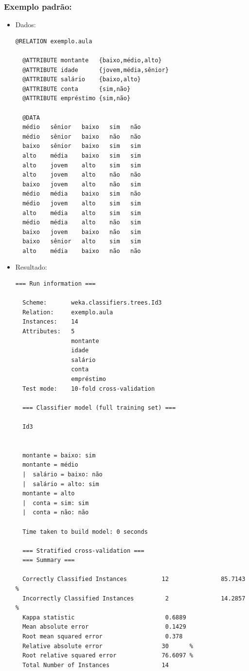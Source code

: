 \documentclass[
    article,            %
    11pt,               %
    oneside,            %
    a4paper,            %
    english,            %
    brazil,             %
    sumario=tradicional,
    ]{abntex2}
\begin{document}
\subsubsection{\textbf{Exemplo padrão:}}

\begin{itemize}
  \item Dados:
  \begin{Verbatim}[frame=single, fontsize=\tiny]
  @RELATION exemplo.aula

  @ATTRIBUTE montante   {baixo,médio,alto}
  @ATTRIBUTE idade      {jovem,média,sênior}
  @ATTRIBUTE salário    {baixo,alto}
  @ATTRIBUTE conta      {sim,não}
  @ATTRIBUTE empréstimo {sim,não}

  @DATA
  médio   sênior   baixo   sim   não 
  médio   sênior   baixo   não   não 
  baixo   sênior   baixo   sim   sim 
  alto    média    baixo   sim   sim 
  alto    jovem    alto    sim   sim 
  alto    jovem    alto    não   não 
  baixo   jovem    alto    não   sim 
  médio   média    baixo   sim   não 
  médio   jovem    alto    sim   sim 
  alto    média    alto    sim   sim 
  médio   média    alto    não   sim 
  baixo   jovem    baixo   não   sim 
  baixo   sênior   alto    sim   sim 
  alto    média    baixo   não   não 
  \end{Verbatim}
  
  \item Resultado:
  \begin{Verbatim}[frame=single, fontsize=\tiny]
  === Run information ===

  Scheme:       weka.classifiers.trees.Id3 
  Relation:     exemplo.aula
  Instances:    14
  Attributes:   5
                montante
                idade
                salário
                conta
                empréstimo
  Test mode:    10-fold cross-validation

  === Classifier model (full training set) ===

  Id3


  montante = baixo: sim
  montante = médio
  |  salário = baixo: não
  |  salário = alto: sim
  montante = alto
  |  conta = sim: sim
  |  conta = não: não

  Time taken to build model: 0 seconds

  === Stratified cross-validation ===
  === Summary ===

  Correctly Classified Instances          12               85.7143 %
  Incorrectly Classified Instances         2               14.2857 %
  Kappa statistic                          0.6889
  Mean absolute error                      0.1429
  Root mean squared error                  0.378 
  Relative absolute error                 30      %
  Root relative squared error             76.6097 %
  Total Number of Instances               14     


\end{Verbatim}
\end{itemize}
\end{document}
